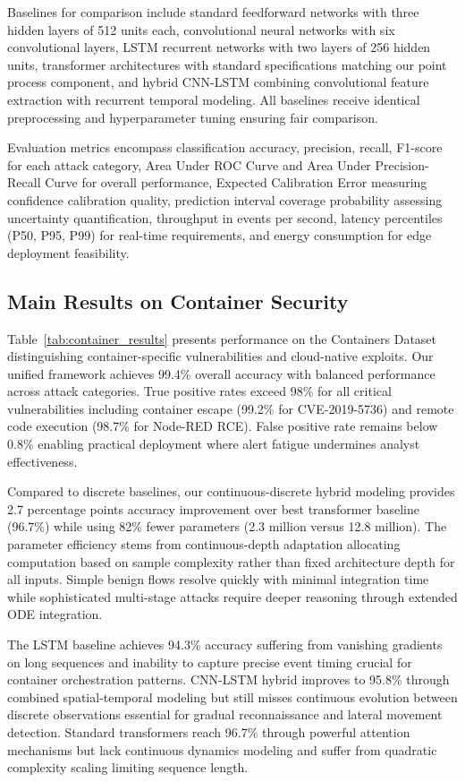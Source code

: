 \documentclass[10pt,journal,compsoc]{IEEEtran}
\begin{document}
Baselines for comparison include standard feedforward networks with three hidden layers of 512 units each, convolutional neural networks with six convolutional layers, LSTM recurrent networks with two layers of 256 hidden units, transformer architectures with standard specifications matching our point process component, and hybrid CNN-LSTM combining convolutional feature extraction with recurrent temporal modeling. All baselines receive identical preprocessing and hyperparameter tuning ensuring fair comparison.

Evaluation metrics encompass classification accuracy, precision, recall, F1-score for each attack category, Area Under ROC Curve and Area Under Precision-Recall Curve for overall performance, Expected Calibration Error measuring confidence calibration quality, prediction interval coverage probability assessing uncertainty quantification, throughput in events per second, latency percentiles (P50, P95, P99) for real-time requirements, and energy consumption for edge deployment feasibility.

\subsection{Main Results on Container Security}

Table~\ref{tab:container_results} presents performance on the Containers Dataset distinguishing container-specific vulnerabilities and cloud-native exploits. Our unified framework achieves 99.4\% overall accuracy with balanced performance across attack categories. True positive rates exceed 98\% for all critical vulnerabilities including container escape (99.2\% for CVE-2019-5736) and remote code execution (98.7\% for Node-RED RCE). False positive rate remains below 0.8\% enabling practical deployment where alert fatigue undermines analyst effectiveness.

Compared to discrete baselines, our continuous-discrete hybrid modeling provides 2.7 percentage points accuracy improvement over best transformer baseline (96.7\%) while using 82\% fewer parameters (2.3 million versus 12.8 million). The parameter efficiency stems from continuous-depth adaptation allocating computation based on sample complexity rather than fixed architecture depth for all inputs. Simple benign flows resolve quickly with minimal integration time while sophisticated multi-stage attacks require deeper reasoning through extended ODE integration.

The LSTM baseline achieves 94.3\% accuracy suffering from vanishing gradients on long sequences and inability to capture precise event timing crucial for container orchestration patterns. CNN-LSTM hybrid improves to 95.8\% through combined spatial-temporal modeling but still misses continuous evolution between discrete observations essential for gradual reconnaissance and lateral movement detection. Standard transformers reach 96.7\% through powerful attention mechanisms but lack continuous dynamics modeling and suffer from quadratic complexity scaling limiting sequence length.
\end{document}
